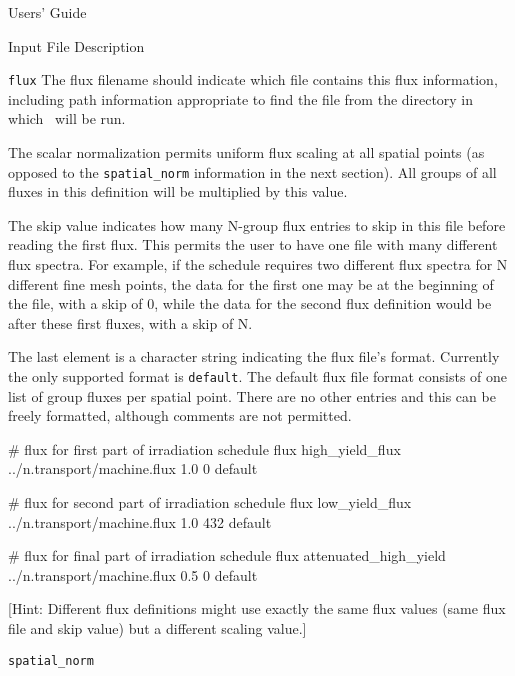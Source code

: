 \begin{chapter}{Users' Guide\label{app:user.guide}}
\begin{section}{Input File Description\label{app:user.input}}
\begin{subsection}{\texttt{flux}\label{app:user.input.flux}}
      The flux filename should indicate which file contains this flux
      information, including path information appropriate to find the
      file from the directory in which \ALARA\ will be run.
      
      The scalar normalization permits uniform flux scaling at all
      spatial points (as opposed to the \texttt{spatial\_norm}
      information in the next section).  All groups of all fluxes in
      this definition will be multiplied by this value.
      
      The skip value indicates how many N-group flux entries to skip
      in this file before reading the first flux.  This permits the
      user to have one file with many different flux spectra.  For
      example, if the schedule requires two different flux spectra for
      N different fine mesh points, the data for the first one may be
      at the beginning of the file, with a skip of 0, while the data
      for the second flux definition would be after these first
      fluxes, with a skip of N.
      
      The last element is a character string indicating the flux
      file's format.  Currently the only supported format is
      \texttt{default}.  The default flux file format consists of one
      list of group fluxes per spatial point.  There are no other
      entries and this can be freely formatted, although comments are
      not permitted.

      \begin{center}
        \renewcommand{\baselinestretch}{1}\normalsize
        \begin{boxedverbatim}
# flux for first part of irradiation schedule
flux high_yield_flux ../n.transport/machine.flux 1.0 0 default

# flux for second part of irradiation schedule
flux low_yield_flux ../n.transport/machine.flux 1.0 432 default

# flux for final part of irradiation schedule
flux attenuated_high_yield ../n.transport/machine.flux 0.5 0 default
\end{boxedverbatim}
      \end{center}
      
      [Hint: Different flux definitions might use exactly the same
      flux values (same flux file and skip value) but a different
      scaling value.]
    \end{subsection}

    \begin{subsection}{\texttt{spatial\_norm}\label{app:user.input.norm}}
      

\end{subsection}
\end{section}
\end{chapter}
